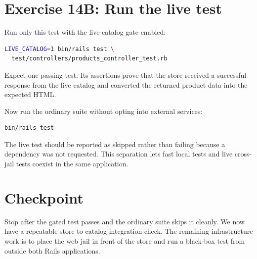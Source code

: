\section{Exercise 14B: Run the live test}

Run only this test with the live-catalog gate enabled:

\begin{lstlisting}[language=sh]
LIVE_CATALOG=1 bin/rails test \
  test/controllers/products_controller_test.rb
\end{lstlisting}

Expect one passing test. Its assertions prove that the store received a
successful response from the live catalog and converted the returned product
data into the expected HTML.

Now run the ordinary suite without opting into external services:

\begin{lstlisting}[language=sh]
bin/rails test
\end{lstlisting}

The live test should be reported as skipped rather than failing because a
dependency was not requested. This separation lets fast local tests and live
cross-jail tests coexist in the same application.

\section{Checkpoint}

Stop after the gated test passes and the ordinary suite skips it cleanly. We
now have a repeatable store-to-catalog integration check. The remaining
infrastructure work is to place the web jail in front of the store and run a
black-box test from outside both Rails applications.

